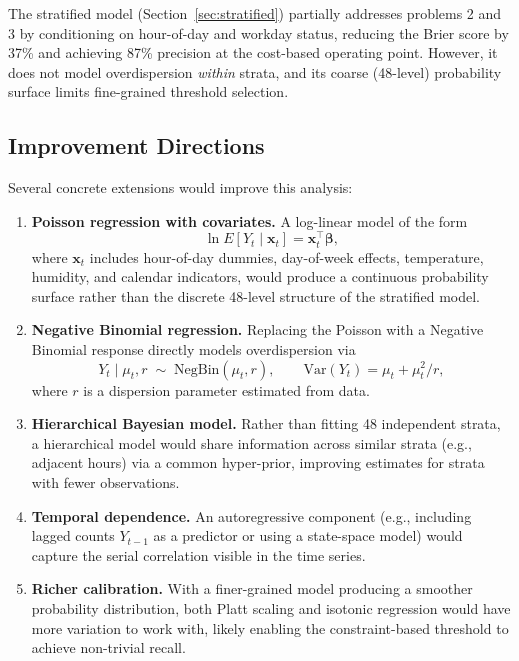 \documentclass[12pt]{article}
\begin{document}
The stratified model (Section~\ref{sec:stratified}) partially
addresses problems 2 and 3 by conditioning on hour-of-day and workday
status, reducing the Brier score by 37\% and achieving 87\% precision
at the cost-based operating point.  However, it does not model
overdispersion \emph{within} strata, and its coarse (48-level)
probability surface limits fine-grained threshold selection.

\subsection{Improvement Directions}

Several concrete extensions would improve this analysis:

\begin{enumerate}
\item \textbf{Poisson regression with covariates.}  A log-linear
  model of the form
  \begin{equation}
  \ln E[Y_t \mid \mathbf{x}_t] = \mathbf{x}_t^\top \boldsymbol{\beta},
  \end{equation}
  where $\mathbf{x}_t$ includes hour-of-day dummies, day-of-week
  effects, temperature, humidity, and calendar indicators, would
  produce a continuous probability surface rather than the discrete
  48-level structure of the stratified model.

\item \textbf{Negative Binomial regression.}  Replacing the Poisson
  with a Negative Binomial response directly models overdispersion
  via
  \begin{equation}
  Y_t \mid \mu_t, r \;\sim\; \text{NegBin}(\mu_t, r),
  \qquad \text{Var}(Y_t) = \mu_t + \mu_t^2/r,
  \end{equation}
  where $r$ is a dispersion parameter estimated from data.

\item \textbf{Hierarchical Bayesian model.}  Rather than fitting 48
  independent strata, a hierarchical model would share information
  across similar strata (e.g., adjacent hours) via a common
  hyper-prior, improving estimates for strata with fewer observations.

\item \textbf{Temporal dependence.}  An autoregressive component
  (e.g., including lagged counts $Y_{t-1}$ as a predictor or using a
  state-space model) would capture the serial correlation visible in
  the time series.

\item \textbf{Richer calibration.}  With a finer-grained model
  producing a smoother probability distribution, both Platt scaling
  and isotonic regression would have more variation to work with,
  likely enabling the constraint-based threshold to achieve non-trivial
  recall.
\end{enumerate}
\end{document}
